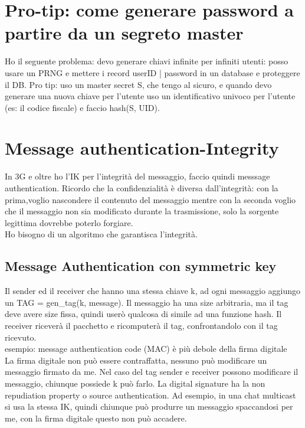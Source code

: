 \documentclass[16px]{article}
\begin{document}
\section{Pro-tip: come generare password a partire da un segreto master}
Ho il seguente problema: devo generare chiavi infinite per infiniti utenti: posso usare un PRNG e mettere i record userID | password in un database e proteggere il DB. Pro tip: uso un master secret S, che tengo al sicuro, e quando devo generare una nuova chiave per l'utente uso un identificativo univoco per l'utente (es: il codice fiscale) e faccio hash(S, UID).
\section{Message authentication-Integrity}
In 3G e oltre ho l'IK per l'integrità del messaggio, faccio quindi messsage authentication. Ricordo che la confidenzialità è diversa dall'integrità: con la prima,voglio nascondere il contenuto del messaggio mentre con la seconda voglio che il messaggio non sia modificato durante la trasmissione, solo la sorgente legittima dovrebbe poterlo forgiare.\\ Ho bisogno di un algoritmo che garantisca l'integrità.
\subsection{Message Authentication con symmetric key}
Il sender ed il receiver che hanno una stessa chiave k, ad ogni messaggio aggiungo un TAG = gen\_tag(k, message). Il messaggio ha una size arbitraria, ma il tag deve avere size fissa, quindi userò qualcosa di simile ad una funzione hash. Il receiver riceverà il pacchetto e ricomputerà il tag, confrontandolo con il tag ricevuto. \\ esempio: message authentication code (MAC) è più debole della firma digitale\\
La firma digitale non può essere contraffatta, nessuno può modificare un messaggio firmato da me. Nel caso del tag sender e receiver possono modificare il messaggio, chiunque possiede k può farlo. La digital signature ha la non repudiation property o source authentication. Ad esempio, in una chat multicast si usa la stessa IK, quindi chiunque può produrre un messaggio spaccandosi per me, con la firma digitale questo non può accadere.
\end{document}
